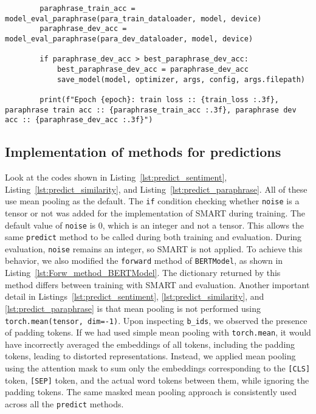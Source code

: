 \begin{lstlisting}
        paraphrase_train_acc = model_eval_paraphrase(para_train_dataloader, model, device)
        paraphrase_dev_acc = model_eval_paraphrase(para_dev_dataloader, model, device)

        if paraphrase_dev_acc > best_paraphrase_dev_acc:
            best_paraphrase_dev_acc = paraphrase_dev_acc
            save_model(model, optimizer, args, config, args.filepath)

        print(f"Epoch {epoch}: train loss :: {train_loss :.3f}, paraphrase train acc :: {paraphrase_train_acc :.3f}, paraphrase dev acc :: {paraphrase_dev_acc :.3f}")

\end{lstlisting}

\subsection{Implementation of methods for predictions}

Look at the codes shown in Listing~\ref{lst:predict_sentiment}, Listing~\ref{lst:predict_similarity}, and Listing~\ref{lst:predict_paraphrase}. All of these use mean pooling as the default. The \texttt{if} condition checking whether \texttt{noise} is a tensor or not was added for the implementation of SMART during training. The default value of \texttt{noise} is $0$, which is an integer and not a tensor. This allows the same \texttt{predict} method to be called during both training and evaluation. During evaluation, \texttt{noise} remains an integer, so SMART is not applied. To achieve this behavior, we also modified the \texttt{forward} method of \texttt{BERTModel}, as shown in Listing~\ref{lst:Forw_method_BERTModel}. The dictionary returned by this method differs between training with SMART and evaluation. Another important detail in Listings~\ref{lst:predict_sentiment}, \ref{lst:predict_similarity}, and \ref{lst:predict_paraphrase} is that mean pooling is not performed using \texttt{torch.mean(tensor, dim=-1)}. Upon inspecting \texttt{b\_ids}, we observed the presence of padding tokens. If we had used simple mean pooling with \texttt{torch.mean}, it would have incorrectly averaged the embeddings of all tokens, including the padding tokens, leading to distorted representations. Instead, we applied mean pooling using the attention mask to sum only the embeddings corresponding to the \texttt{[CLS]} token, \texttt{[SEP]} token, and the actual word tokens between them, while ignoring the padding tokens. The same masked mean pooling approach is consistently used across all the \texttt{predict} methods. 


